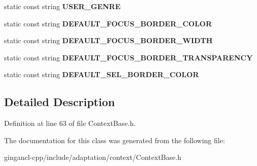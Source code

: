 \begin{CompactItemize}
\item 
static const string {\bf USER\_\-GENRE}\label{classbr_1_1pucrio_1_1telemidia_1_1ginga_1_1ncl_1_1adaptation_1_1context_1_1ContextBase_85b85b25b2494836bd8562bed50db30d}

\item 
static const string {\bf DEFAULT\_\-FOCUS\_\-BORDER\_\-COLOR}\label{classbr_1_1pucrio_1_1telemidia_1_1ginga_1_1ncl_1_1adaptation_1_1context_1_1ContextBase_aa825c12ff35b3614f1bda5c3c151cb8}

\item 
static const string {\bf DEFAULT\_\-FOCUS\_\-BORDER\_\-WIDTH}\label{classbr_1_1pucrio_1_1telemidia_1_1ginga_1_1ncl_1_1adaptation_1_1context_1_1ContextBase_6c0627f270354186b7cd9ddfcce49425}

\item 
static const string {\bf DEFAULT\_\-FOCUS\_\-BORDER\_\-TRANSPARENCY}\label{classbr_1_1pucrio_1_1telemidia_1_1ginga_1_1ncl_1_1adaptation_1_1context_1_1ContextBase_d71a77ce8eafa23637006bc010656a99}

\item 
static const string {\bf DEFAULT\_\-SEL\_\-BORDER\_\-COLOR}\label{classbr_1_1pucrio_1_1telemidia_1_1ginga_1_1ncl_1_1adaptation_1_1context_1_1ContextBase_f4609f6d91785e0aa67a9d972e98ba1f}

\end{CompactItemize}


\subsection{Detailed Description}




Definition at line 63 of file ContextBase.h.

The documentation for this class was generated from the following file:\begin{CompactItemize}
\item 
gingancl-cpp/include/adaptation/context/ContextBase.h\end{CompactItemize}
